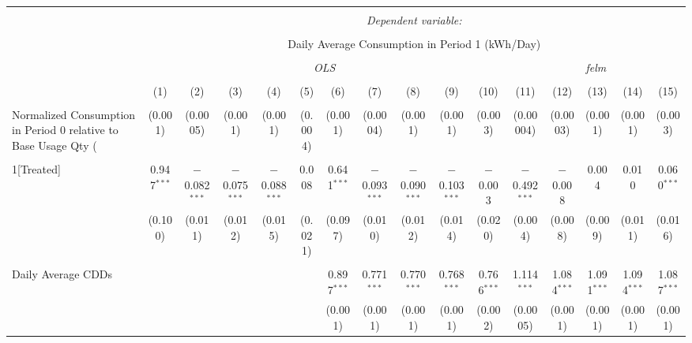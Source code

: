 
\begin{table}[!htbp] \centering 
  \caption{} 
  \label{} 
\small 
\begin{tabular}{@{\extracolsep{5pt}}lccccccccccccccc} 
\\[-1.8ex]\hline 
\hline \\[-1.8ex] 
 & \multicolumn{15}{c}{\textit{Dependent variable:}} \\ 
\cline{2-16} 
\\[-1.8ex] & \multicolumn{15}{c}{Daily Average Consumption in Period 1 (kWh/Day)} \\ 
\\[-1.8ex] & \multicolumn{10}{c}{\textit{OLS}} & \multicolumn{5}{c}{\textit{felm}} \\ 
\\[-1.8ex] & (1) & (2) & (3) & (4) & (5) & (6) & (7) & (8) & (9) & (10) & (11) & (12) & (13) & (14) & (15)\\ 
\hline \\[-1.8ex] 
 Normalized Consumption in Period 0 relative to Base Usage Qty (%
  & (0.001) & (0.0005) & (0.001) & (0.001) & (0.004) & (0.001) & (0.0004) & (0.001) & (0.001) & (0.003) & (0.00004) & (0.0003) & (0.001) & (0.001) & (0.003) \\ 
  & & & & & & & & & & & & & & & \\ 
 1[Treated] & 0.947$^{***}$ & $-$0.082$^{***}$ & $-$0.075$^{***}$ & $-$0.088$^{***}$ & 0.008 & 0.641$^{***}$ & $-$0.093$^{***}$ & $-$0.090$^{***}$ & $-$0.103$^{***}$ & $-$0.003 & $-$0.492$^{***}$ & $-$0.008 & 0.004 & 0.010 & 0.060$^{***}$ \\ 
  & (0.100) & (0.011) & (0.012) & (0.015) & (0.021) & (0.097) & (0.010) & (0.012) & (0.014) & (0.020) & (0.004) & (0.008) & (0.009) & (0.011) & (0.016) \\ 
  & & & & & & & & & & & & & & & \\ 
 Daily Average CDDs &  &  &  &  &  & 0.897$^{***}$ & 0.771$^{***}$ & 0.770$^{***}$ & 0.768$^{***}$ & 0.766$^{***}$ & 1.114$^{***}$ & 1.084$^{***}$ & 1.091$^{***}$ & 1.094$^{***}$ & 1.087$^{***}$ \\ 
  &  &  &  &  &  & (0.001) & (0.001) & (0.001) & (0.001) & (0.002) & (0.0005) & (0.001) & (0.001) & (0.001) & (0.001) \\ 

\end{tabular}
\end{table}
